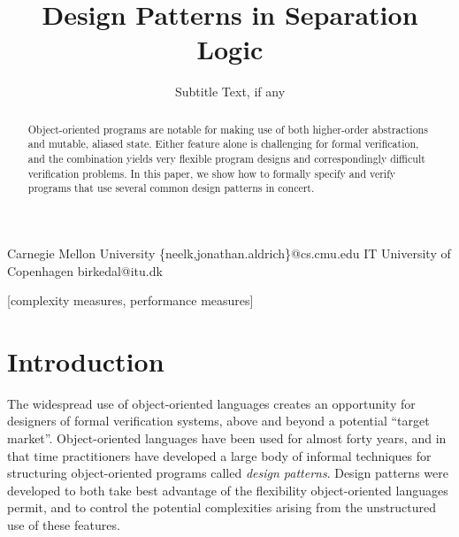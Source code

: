 \documentclass[preprint,natbib]{sigplanconf}
\begin{document}
\copyrightdata{[to be supplied]} 


\title{Design Patterns in Separation Logic}
\subtitle{Subtitle Text, if any}

           {Carnegie Mellon University}
           {\{neelk,jonathan.aldrich\}@cs.cmu.edu}
           {IT University of Copenhagen}
           {birkedal@itu.dk}

\maketitle

\begin{abstract}
Object-oriented programs are notable for making use of both
higher-order abstractions and mutable, aliased state. Either feature
alone is challenging for formal verification, and the combination
yields very flexible program designs and correspondingly difficult
verification problems. In this paper, we show how to
formally specify and verify programs that use several common design
patterns in concert.
\end{abstract}

[complexity measures, performance measures]



\section{Introduction}

The widespread use of object-oriented languages creates an opportunity
for designers of formal verification systems, above and beyond a
potential ``target market''. Object-oriented languages have been used
for almost forty years, and in that time practitioners have developed
a large body of informal techniques for structuring object-oriented
programs called \emph{design patterns}\cite{GoF}.  Design patterns
were developed to both take best advantage of the flexibility
object-oriented languages permit, and to control the potential
complexities arising from the unstructured use of these features.
\end{document}
